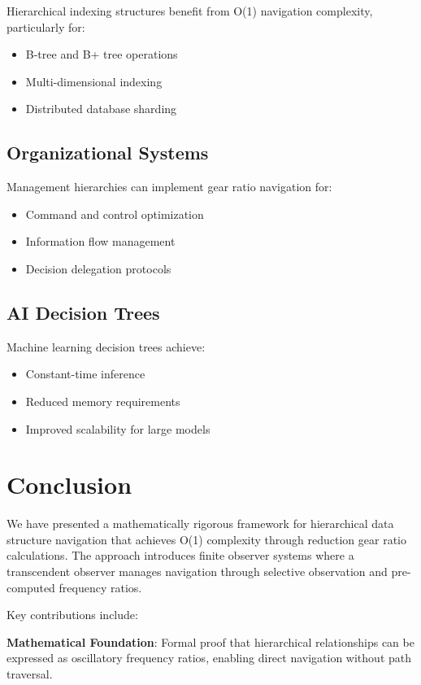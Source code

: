 \documentclass[12pt,a4paper]{article}
\begin{document}
Hierarchical indexing structures benefit from O(1) navigation complexity, particularly for:
\begin{itemize}
\item B-tree and B+ tree operations
\item Multi-dimensional indexing
\item Distributed database sharding
\end{itemize}

\subsection{Organizational Systems}

Management hierarchies can implement gear ratio navigation for:
\begin{itemize}
\item Command and control optimization
\item Information flow management
\item Decision delegation protocols
\end{itemize}

\subsection{AI Decision Trees}

Machine learning decision trees achieve:
\begin{itemize}
\item Constant-time inference
\item Reduced memory requirements
\item Improved scalability for large models
\end{itemize}

\section{Conclusion}

We have presented a mathematically rigorous framework for hierarchical data structure navigation that achieves O(1) complexity through reduction gear ratio calculations. The approach introduces finite observer systems where a transcendent observer manages navigation through selective observation and pre-computed frequency ratios.

Key contributions include:

\textbf{Mathematical Foundation}: Formal proof that hierarchical relationships can be expressed as oscillatory frequency ratios, enabling direct navigation without path traversal.
\end{document}
